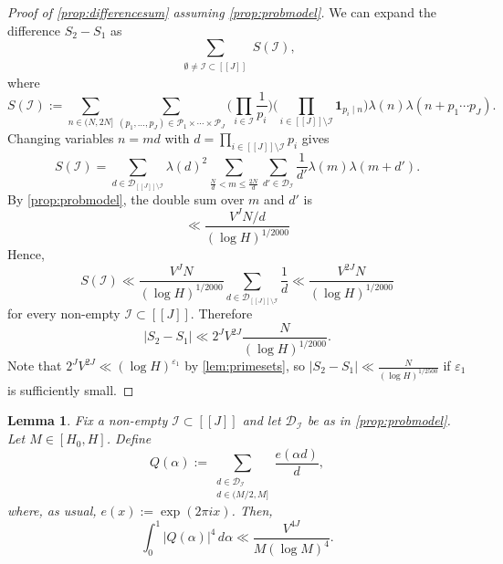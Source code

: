 \documentclass[11pt]{amsart}
\newtheorem{lemma}[theorem]{Lemma}
\theoremstyle{definition}
\renewcommand{\leq}{\leqslant}
\newcommand{\sinterval}[1]{[\![#1]\!] }
\newcommand{\ind}[1]{\mathbf{1}_{#1}}
\newcommand{\eps}{\varepsilon}
\newcommand{\primes}{\mathcal{P}}
\newcommand{\D}{\mathcal{D}}
\newcommand{\cstH}{\eps_1}
\newcommand{\curlyLpower}{V^{\repR}}
\newcommand{\curlyLexp}[1]{V^{#1}}
\newcommand{\indexset}{\mathcal{I}}
\newcommand{\repR}{J}
\newcommand{\newR}{\sinterval{J}}
\newcommand{\otherK}{M}
\begin{document}
\begin{proof}[Proof of \cref{prop:differencesum} assuming \cref{prop:probmodel}]
We can expand the difference $S_2 - S_1$ as 
\begin{equation*}
\sum_{\substack{\emptyset \neq \indexset \subset \newR}} S(\indexset),
\end{equation*}
where
\begin{equation*}
S(\indexset) := \sum_{n\in (N, 2N]} \sum_{(p_1,\ldots, p_{\repR})\in \primes_1\times\cdots\times \primes_{\repR}} \Bigg( \prod_{i\in \indexset} \frac{1}{p_i}\Bigg) \Bigg( \prod_{i\in \newR\setminus \indexset} \ind{p_i \mid n}\Bigg) \lambda(n) \lambda(n+p_1\cdots p_{\repR}).
\end{equation*}
Changing variables $n = md$ with $d = \prod_{i\in \newR\setminus \indexset}p_i$ gives
\begin{equation*}
S(\indexset) = \sum_{d\in \D_{\newR\setminus \indexset}}\lambda(d)^2 \sum_{\frac{N}{d}<m\leq \frac{2N}{d}}\sum_{d'\in \D_\indexset} \frac{1}{d'} \lambda(m) \lambda(m+d').
\end{equation*}
By \cref{prop:probmodel}, the double sum over $m$ and $d'$ is 
\begin{equation*}
\ll \frac{\curlyLpower N/d}{(\log H)^{1/2000}}
\end{equation*}
Hence,
\begin{equation*}
S(\indexset) \ll  \frac{\curlyLpower N}{(\log H)^{1/2000}}\sum_{d\in \D_{\newR\setminus \indexset}}\frac{1}{d} \ll \frac{\curlyLexp{2\repR} N}{(\log H)^{1/2000}}%
\end{equation*}
for every non-empty $\indexset \subset \newR$.
Therefore
\begin{equation*}
|S_2-S_1| \ll 2^{\repR} \curlyLexp{2\repR} \frac{N}{(\log H)^{1/2000}}.%
\end{equation*}
Note that $2^J\curlyLexp{2\repR} \ll (\log H)^{\cstH}$ by \cref{lem:primesets}, so $|S_2-S_1| \ll \frac{N}{(\log H)^{1/2500}}$ if $\cstH$ is sufficiently small.
\end{proof}


\begin{lemma}
\label{lem:fourthmoment}
Fix a non-empty $\indexset\subset \newR$ and let $\D_\indexset$ be as in \cref{prop:probmodel}. Let $\otherK \in [H_0, H]$. Define 
\begin{equation*}
Q(\alpha) := \sum_{\substack{d\in \D_\indexset\\ d\in (\otherK/2, \otherK]}} \frac{e( \alpha d)}{d},
\end{equation*}
where, as usual, $e(x):=\exp(2\pi i x)$. Then, 
\begin{equation*}
\int_{0}^1 |Q(\alpha)|^4 \, d\alpha \ll \frac{\curlyLexp{4\repR}}{\otherK (\log \otherK)^{4}}.
\end{equation*}
\end{lemma}
\end{document}

